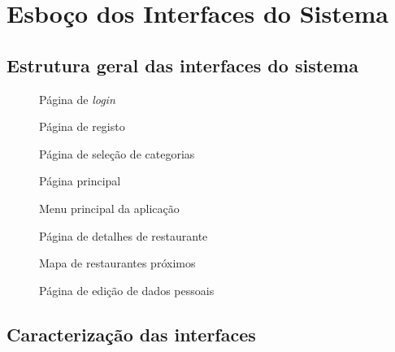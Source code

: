 \documentclass[a4paper,12pt]{scrreprt}
\begin{document}
\chapter{Esboço dos Interfaces do Sistema} 
\section{Estrutura geral das interfaces do sistema}
\begin{figure}[htp]
    \centering
    \caption{Página de \textit{login}}
    \label{fig:login}
\end{figure}
\begin{figure}[htp]
    \centering
    \caption{Página de registo}
    \label{fig:registo}
\end{figure}
\begin{figure}[htp]
    \centering
    \caption{Página de seleção de categorias}
    \label{fig:selec}
\end{figure}
\begin{figure}[htp]
    \centering
    \caption{Página principal}
    \label{fig:home}
\end{figure}
\begin{figure}[htp]
    \centering
    \caption{Menu principal da aplicação}
    \label{fig:menu}
\end{figure}
\begin{figure}[htp]
    \centering
    \caption{Página de detalhes de restaurante}
    \label{fig:restaurante}
\end{figure}
\begin{figure}[htp]
    \centering
    \caption{Mapa de restaurantes próximos}
    \label{fig:mapa}
\end{figure}
\begin{figure}[htp]
    \centering
    \caption{Página de edição de dados pessoais}
    \label{fig:dados}
\end{figure}
        
        
\newpage
\section{Caracterização das interfaces}
\end{document}
